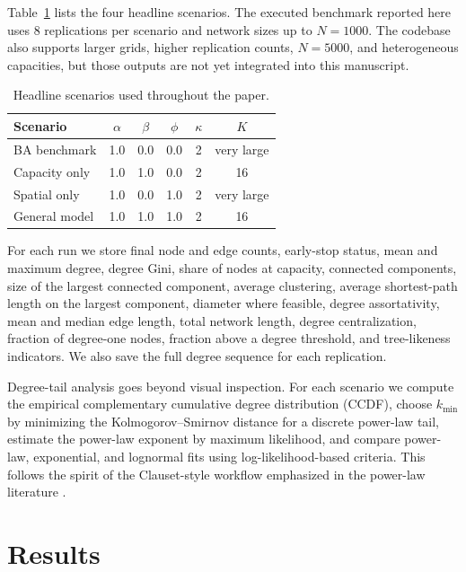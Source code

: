 \documentclass[11pt]{article}
\begin{document}
Table~\ref{tab:headline-scenarios} lists the four headline scenarios. The executed benchmark reported here uses $8$ replications per scenario and network sizes up to $N=1000$. The codebase also supports larger grids, higher replication counts, $N=5000$, and heterogeneous capacities, but those outputs are not yet integrated into this manuscript.

\begin{table}[htbp]
\centering
\caption{Headline scenarios used throughout the paper.}
\label{tab:headline-scenarios}
\begin{tabular}{lccccc}
\toprule
Scenario & $\alpha$ & $\beta$ & $\phi$ & $\kappa$ & $K$ \\
\midrule
BA benchmark & 1.0 & 0.0 & 0.0 & 2 & very large \\
Capacity only & 1.0 & 1.0 & 0.0 & 2 & 16 \\
Spatial only & 1.0 & 0.0 & 1.0 & 2 & very large \\
General model & 1.0 & 1.0 & 1.0 & 2 & 16 \\
\bottomrule
\end{tabular}
\end{table}

For each run we store final node and edge counts, early-stop status, mean and maximum degree, degree Gini, share of nodes at capacity, connected components, size of the largest connected component, average clustering, average shortest-path length on the largest component, diameter where feasible, degree assortativity, mean and median edge length, total network length, degree centralization, fraction of degree-one nodes, fraction above a degree threshold, and tree-likeness indicators. We also save the full degree sequence for each replication.

Degree-tail analysis goes beyond visual inspection. For each scenario we compute the empirical complementary cumulative degree distribution (CCDF), choose $k_{\min}$ by minimizing the Kolmogorov--Smirnov distance for a discrete power-law tail, estimate the power-law exponent by maximum likelihood, and compare power-law, exponential, and lognormal fits using log-likelihood-based criteria. This follows the spirit of the Clauset-style workflow emphasized in the power-law literature \citep{clauset2009power}.

\section{Results}
\label{sec:results}
\end{document}
